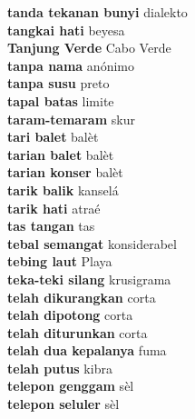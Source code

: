 \textbf{ tanda tekanan bunyi  } dialekto \\
\textbf{ tangkai hati  } beyesa \\
\textbf{ Tanjung Verde  } Cabo Verde \\
\textbf{ tanpa nama  } anónimo \\
\textbf{ tanpa susu  } preto \\
\textbf{ tapal batas  } limite \\
\textbf{ taram-temaram  } skur \\
\textbf{ tari balet  } balèt \\
\textbf{ tarian balet  } balèt \\
\textbf{ tarian konser  } balèt \\
\textbf{ tarik balik  } kanselá \\
\textbf{ tarik hati  } atraé \\
\textbf{ tas tangan  } tas \\
\textbf{ tebal semangat  } konsiderabel \\
\textbf{ tebing laut  } Playa \\
\textbf{ teka-teki silang  } krusigrama \\
\textbf{ telah dikurangkan  } corta \\
\textbf{ telah dipotong  } corta \\
\textbf{ telah diturunkan  } corta \\
\textbf{ telah dua kepalanya  } fuma \\
\textbf{ telah putus  } kibra \\
\textbf{ telepon genggam  } sèl \\
\textbf{ telepon seluler  } sèl \\
